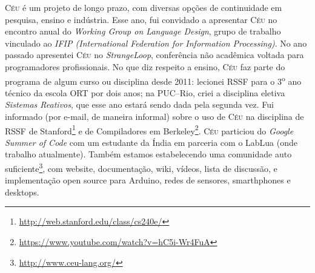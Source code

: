 \documentclass[12pt,a4paper]{article}
\newcommand{\CEU}{\textsc{C\'{e}u}\xspace}
\begin{document}
\CEU é um projeto de longo prazo, com diversas opções de continuidade em 
pesquisa, ensino e indústria.
%
Esse ano, fui convidado a apresentar \CEU no encontro anual do \emph{Working 
Group on Language Design}, grupo de trabalho vinculado ao \emph{IFIP 
(International Federation for Information Processing)}.
%
No ano passado apresentei \CEU no \emph{StrangeLoop}, conferência não acadêmica 
voltada para programadores profissionais.
%
No que diz respeito a ensino, \CEU faz parte do programa de algum curso ou 
disciplina desde 2011:
lecionei RSSF para o 3\textsuperscript{o} ano técnico da escola ORT por dois 
anos;
na PUC--Rio, criei a disciplina eletiva \emph{Sistemas Reativos}, que esse ano
estará sendo dada pela segunda vez.
%
Fui informado (por e-mail, de maneira informal) sobre o uso de \CEU na 
disciplina de RSSF de 
Stanford\footnote{\url{http://web.stanford.edu/class/cs240e/}} e de 
Compiladores em 
Berkeley\footnote{\url{https://www.youtube.com/watch?v=hC5i-Wr4FuA}}.
%
\CEU particiou do \emph{Google Summer of Code} com um estudante da Índia em 
parceria com o LabLua (onde trabalho atualmente).
%
Também estamos estabelecendo uma comunidade auto 
suficiente\footnote{\url{http://www.ceu-lang.org/}}, com website,
documentação, wiki, vídeos, lista de discussão, e implementação open source 
para Arduino, redes de sensores, smarthphones e desktops.



\end{document}
